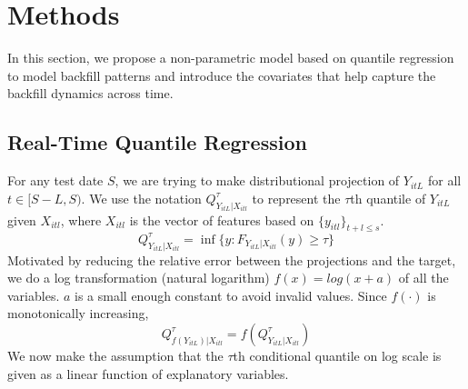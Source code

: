    
\section{Methods}
In this section, we propose a non-parametric model based on quantile regression to model backfill patterns and introduce the covariates that help capture the backfill dynamics across time. 

\subsection{Real-Time Quantile Regression}

For any test date $S$, we are trying to make distributional projection of $Y_{itL}$ for all $t \in [S-L, S)$. We use the notation $Q_{Y_{itL}|X_{itl}}^{\tau}$ to represent the $\tau$th quantile of $Y_{itL}$ given $X_{itl}$, where $X_{itl}$ is the vector of features based on $\{y_{itl}\}_{t+l\leq s}$. 
$$Q_{Y_{itL}|X_{itl}}^{\tau} = \inf \{y: F_{Y_{itL}|X_{itl}}(y) \geq \tau\}$$
Motivated by reducing the relative error between the projections and the target, we do a log transformation (natural logarithm) $f(x) = log(x + a)$ of all the variables. $a$ is a small enough constant to avoid invalid values. Since $f(\cdot)$ is monotonically increasing, 
$$ Q_{f(Y_{itL})|X_{itl}}^{\tau} = f(Q_{Y_{itL}|X_{itl}}^{\tau}) $$
We now make the assumption that the $\tau$th conditional quantile on log scale is given as a linear function of explanatory variables.

